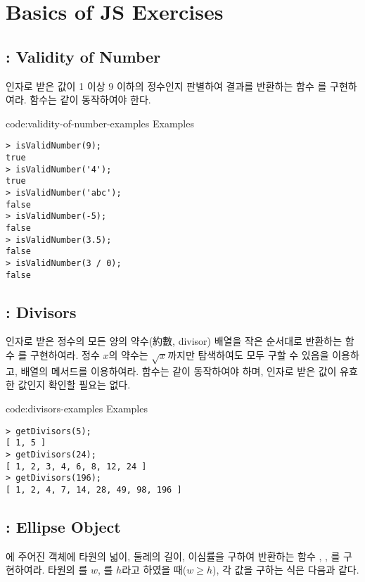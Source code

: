 \section{Basics of JS Exercises}\label{sect:basic-js-exercises}

\subsection*{: Validity of Number}
인자로 받은 값이 1 이상 9 이하의 정수인지 판별하여 결과를 반환하는 함수 를 구현하여라.  함수는 \와 같이 동작하여야 한다.

\begin{codeenv}{code:validity-of-number-examples}{ Examples}
\begin{verbatim}
> isValidNumber(9);
true
> isValidNumber('4');
true
> isValidNumber('abc');
false
> isValidNumber(-5);
false
> isValidNumber(3.5);
false
> isValidNumber(3 / 0);
false
\end{verbatim}
\end{codeenv}

\subsection*{: Divisors}
인자로 받은 정수의 모든 양의 약수(約數, divisor) 배열을 작은 순서대로 반환하는 함수 를 구현하여라. 정수 $x$의 약수는 $\sqrt{x}$까지만 탐색하여도 모두 구할 수 있음을 이용하고, 배열의  메서드를 이용하여라.  함수는 \와 같이 동작하여야 하며, 인자로 받은 값이 유효한 값인지 확인할 필요는 없다.

\begin{codeenv}{code:divisors-examples}{ Examples}\begin{verbatim}
> getDivisors(5);
[ 1, 5 ]
> getDivisors(24);
[ 1, 2, 3, 4, 6, 8, 12, 24 ]
> getDivisors(196);
[ 1, 2, 4, 7, 14, 28, 49, 98, 196 ]
\end{verbatim}
\end{codeenv}
\clearpage

\subsection*{: Ellipse Object}
에 주어진  객체에 타원의 넓이, 둘레의 길이, 이심률을 구하여 반환하는 함수 , , 를 구현하여라. 타원의 를 $w$, 를 $h$라고 하였을 때($w\geq h$), 각 값을 구하는 식은 다음과 같다.

